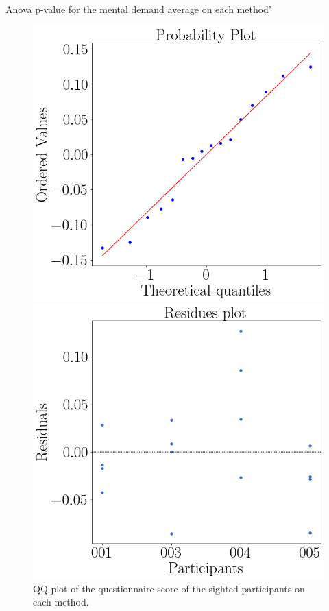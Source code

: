 \begin{table}
    \caption{Anova p-value for the mental demand average on each method'}
    \label{tab:blocanova_questionnaire_blind_sight}
\begin{minipage}{0.45\textwidth}
    
\end{minipage}
\begin{minipage}{0.45\textwidth}
    
\end{minipage}
\end{table}

\begin{figure}[!htb]
    \centering
    \begin{minipage}{0.45\textwidth}
        \centering
        \includegraphics[width = 0.8\linewidth]{Resultados/Questionario/Figuras/png/qqplot_questionnaires_sight.png}
        \caption{QQ plot of the questionnaire score of the sighted participants on each method.}
        \label{fig:qqplot_questionnaires_sight}
    \end{minipage}
    \begin{minipage}{0.45\textwidth}
        \centering
        \includegraphics[width = 0.8\linewidth]{Resultados/Questionario/Figuras/png/residplot_questionnaires_sight.png}

\end{minipage}
\end{figure}
